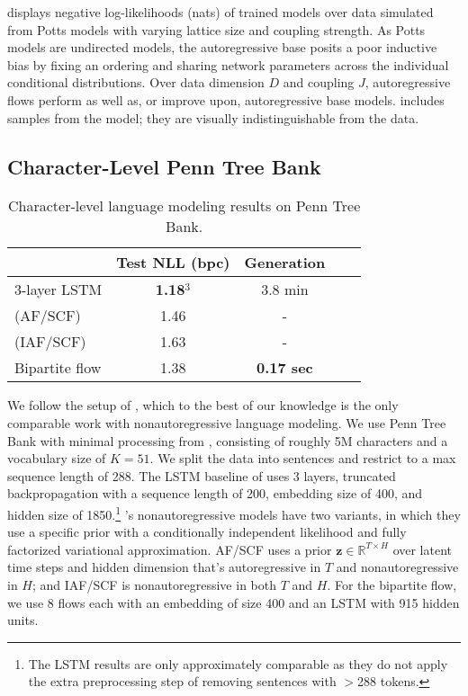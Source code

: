 \documentclass{article}
\newcommand{\mathbold}[1]{\ensuremath{\boldsymbol{\mathbf{#1}}}}
\newcommand{\nestedmathbold}[1]{{\mathbold{#1}}}
\newcommand{\mbz}{\nestedmathbold{z}}
\begin{document}
 displays negative log-likelihoods (nats) of trained models over data simulated from Potts models with varying lattice size and coupling strength. As Potts models are undirected models, the autoregressive base posits a poor inductive bias by fixing an ordering and sharing network parameters across the individual conditional distributions. Over data dimension $D$ and coupling $J$, autoregressive flows perform as well as, or improve upon, autoregressive base models.  includes samples from the model; they are visually indistinguishable from the data.

\subsection{Character-Level Penn Tree Bank}

\begin{table*}[!t]
\centering
\begin{tabular}{lcccc}
\\  \toprule
& Test NLL (bpc) & Generation \\ \midrule
3-layer LSTM \citep{merity2018analysis}  & \textbf{1.18$^3$} &  3.8 min \\
\citet{ziegler2019latent} (AF/SCF) &  1.46 & - \\
\citet{ziegler2019latent} (IAF/SCF) &  1.63 & - \\
Bipartite flow & 1.38 & \textbf{0.17 sec} \\
\bottomrule
\end{tabular}
\caption{Character-level language modeling results on Penn Tree Bank. }
\label{table:ptb}
\end{table*}

We follow the setup of \citet{ziegler2019latent}, which to the best of our knowledge is the only comparable work with nonautoregressive language modeling. We use Penn Tree Bank with minimal processing from \citet{mikolov2012subword}, consisting of roughly 5M characters and a vocabulary size of $K=51$.
We split the data into sentences and restrict to a max sequence length of 288.
The LSTM baseline of \citet{merity2018analysis} uses 3 layers, truncated backpropagation with a sequence length of 200, embedding size of 400, and hidden size of 1850.\footnote{The LSTM results are only approximately comparable as they do not apply the extra preprocessing step of removing sentences with $>$288 tokens.} \citet{ziegler2019latent}'s nonautoregressive models  have two variants, in which they use a specific prior with a conditionally independent likelihood and fully factorized variational approximation. AF/SCF uses a prior $\mbz\in\mathbb{R}^{T\times H}$ over latent time steps and hidden dimension that's autoregressive in $T$ and nonautoregressive in $H$; and IAF/SCF is nonautoregressive in both $T$ and $H$. For the bipartite flow, we use 8 flows each with an embedding of size 400 and an LSTM with 915 hidden units.
\end{document}
